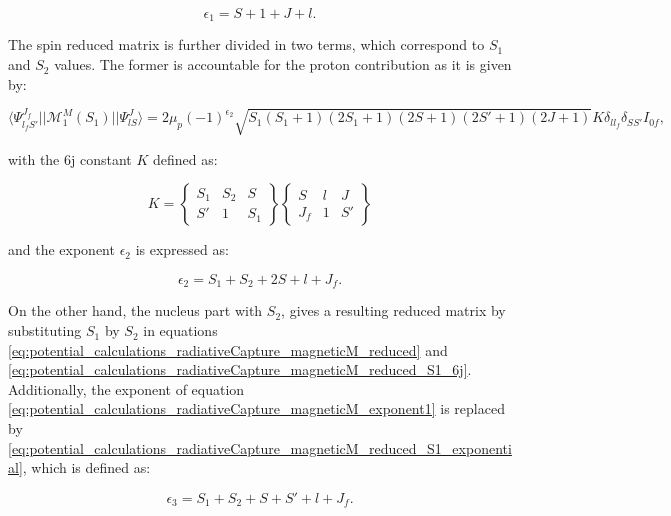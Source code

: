 \documentclass[openany]{book}
\begin{document}
\begin{equation}\label{eq:potential_calculations_radiativeCapture_magneticM_exponent1}
	\epsilon_1 = S + 1 + J + l.
\end{equation}

The spin reduced matrix is further divided in two terms, which correspond to $S_1$ and $S_2$ values. The former is accountable for the proton contribution as it is given by:

\begin{equation}\label{eq:potential_calculations_radiativeCapture_magneticM_reduced_S1}
	\langle \Psi^{J_f}_{l_fS'}  ||  \mathcal{M}^{M}_1(S_1) ||  \Psi^{J}_{lS} \rangle = 2\mu_p (-1)^{\epsilon_2} \sqrt{S_1(S_1+1)(2S_1 + 1)(2S + 1)(2S' + 1)(2J + 1)}  K \delta_{ll_f} \delta_{SS'} I_{0f},
\end{equation}

with the 6j constant $K$ defined as:

\begin{equation}\label{eq:potential_calculations_radiativeCapture_magneticM_reduced_S1_6j}
	K =	\left \{ \begin{matrix}
		S_1& S_2 & S\\
		S' & 1 & S_1
	\end{matrix} \right \}  \left \{ \begin{matrix}
		S & l & J\\
		J_f & 1 & S'
	\end{matrix} \right \}
\end{equation}

and the exponent $\epsilon_2$ is expressed as: 

\begin{equation}\label{eq:potential_calculations_radiativeCapture_magneticM_reduced_S1_exponential}
	\epsilon_2 = S_1 + S_2 + 2S + l + J_f.
\end{equation}

On the other hand, the nucleus part with $S_2$, gives a resulting reduced matrix by substituting $S_1$ by $S_2$ in equations \ref{eq:potential_calculations_radiativeCapture_magneticM_reduced} and \ref{eq:potential_calculations_radiativeCapture_magneticM_reduced_S1_6j}. Additionally, the exponent of equation \ref{eq:potential_calculations_radiativeCapture_magneticM_exponent1} is replaced by \ref{eq:potential_calculations_radiativeCapture_magneticM_reduced_S1_exponential}, which is defined as:

\begin{equation}\label{eq:potential_calculations_radiativeCapture_magneticM_reduced_S2_exponential}
	\epsilon_3 = S_1 + S_2 + S + S' + l + J_f.
\end{equation}
\end{document}
